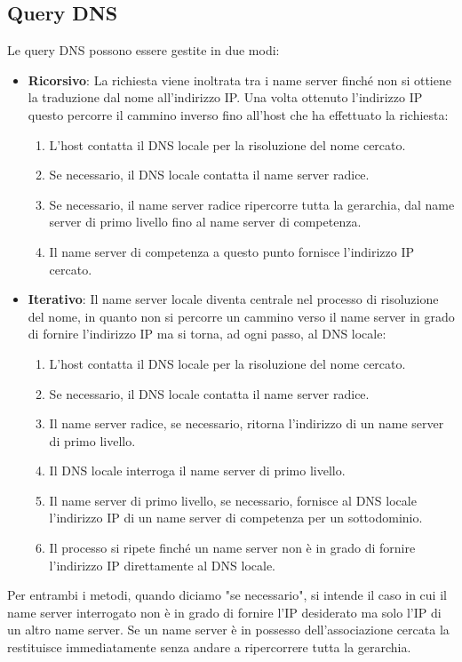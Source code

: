 \subsection{Query DNS}
Le query DNS possono essere gestite in due modi:
\begin{itemize}
	\item \textbf{Ricorsivo}:
		La richiesta viene inoltrata tra i name server finché non si 
		ottiene la traduzione dal nome all'indirizzo IP. Una volta 
		ottenuto l'indirizzo IP questo percorre il cammino inverso
		fino all'host che ha effettuato la richiesta:
		\begin{enumerate}
			\item L'host contatta il DNS locale per la risoluzione 
				del nome cercato.
			\item Se necessario, il DNS locale contatta il name 
				server radice.
			\item Se necessario, il name server radice ripercorre 
				tutta la gerarchia, dal name server di primo livello 
				fino al name server di competenza.
			\item Il name server di competenza a questo punto 
				fornisce l'indirizzo IP cercato.
		\end{enumerate}
	\item \textbf{Iterativo}: Il name server locale diventa centrale 
		nel processo di risoluzione del nome, in quanto non si percorre
		un cammino verso il name server in grado di fornire l'indirizzo
		IP ma si torna, ad ogni passo, al DNS locale:
		\begin{enumerate}
			\item L'host contatta il DNS locale per la risoluzione 
				del nome cercato.
			\item Se necessario, il DNS locale contatta il name 
				server radice.
			\item Il name server radice, se necessario, ritorna 
				l'indirizzo di un name server di primo livello.
			\item Il DNS locale interroga il name server di primo 
				livello.
			\item Il name server di primo livello, se necessario, 
				fornisce al DNS locale l'indirizzo IP di un name 
				server di competenza per un sottodominio.
			\item Il processo si ripete finché un name server non è
				in grado di fornire l'indirizzo IP direttamente al 
				DNS locale.
		\end{enumerate}
\end{itemize}
Per entrambi i metodi, quando diciamo "se necessario", si intende il 
caso in cui il name server interrogato non è in grado di fornire l'IP 
desiderato ma solo l'IP di un altro name server. Se un name server è in
possesso dell'associazione cercata la restituisce immediatamente senza 
andare a ripercorrere tutta la gerarchia.

